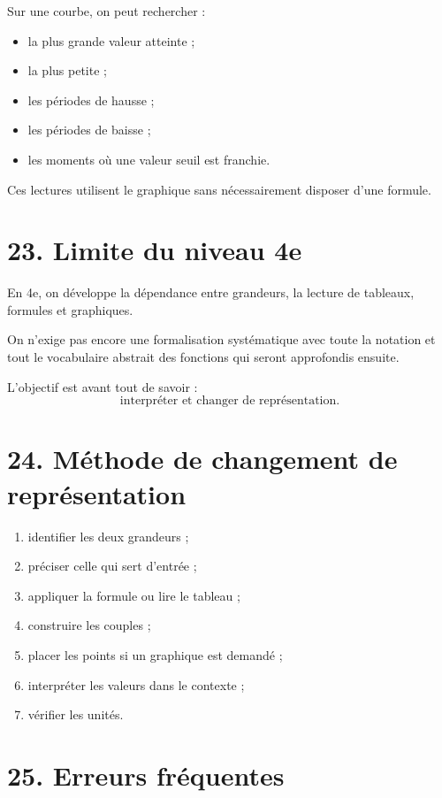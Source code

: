 Sur une courbe, on peut rechercher :
\begin{itemize}
\item la plus grande valeur atteinte ;
\item la plus petite ;
\item les périodes de hausse ;
\item les périodes de baisse ;
\item les moments où une valeur seuil est franchie.
\end{itemize}

Ces lectures utilisent le graphique sans nécessairement disposer d'une formule.

\section{23. Limite du niveau 4e}

\begin{attention}
En 4e, on développe la dépendance entre grandeurs, la lecture de tableaux, formules et graphiques.

On n'exige pas encore une formalisation systématique avec toute la notation et tout le vocabulaire abstrait des fonctions qui seront approfondis ensuite.
\end{attention}

L'objectif est avant tout de savoir :
\[
\text{interpréter et changer de représentation}.
\]

\section{24. Méthode de changement de représentation}

\begin{methode}
\begin{enumerate}
\item identifier les deux grandeurs ;
\item préciser celle qui sert d'entrée ;
\item appliquer la formule ou lire le tableau ;
\item construire les couples ;
\item placer les points si un graphique est demandé ;
\item interpréter les valeurs dans le contexte ;
\item vérifier les unités.
\end{enumerate}
\end{methode}

\section{25. Erreurs fréquentes}

